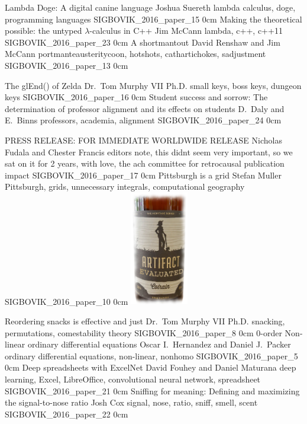 \addpaper
	{Lambda Doge: A digital canine language}
	{Joshua Suereth}
	{lambda calculus, doge, programming languages}
	{SIGBOVIK_2016_paper_15}
	{0cm}
	{}
\addpaper
	{Making the theoretical possible: the untyped $\lambda$-calculus in C++}
	{Jim McCann}
	{lambda, c++, c++11}
	{SIGBOVIK_2016_paper_23}
	{0cm}
	{}
\addpaper
	{A shortmantout}
	{David Renshaw and Jim McCann}
	{portmanteausteritycoon, hotshots, cathartichokes, sadjustment}
	{SIGBOVIK_2016_paper_13}
	{0cm}
	{}

\addpaper
	{The glEnd() of Zelda}
	{Dr.\ Tom Murphy VII Ph.D.}
	{small keys, boss keys, dungeon keys}
	{SIGBOVIK_2016_paper_16}
	{0cm}
	{}
\addpaper
	{Student success and sorrow: The determination of professor alignment and its effects on students}
	{D.\ Daly and E.\ Binns}
	{professors, academia, alignment}
	{SIGBOVIK_2016_paper_24}
	{0cm}
	{}

\addpaper
	{PRESS RELEASE: FOR IMMEDIATE WORLDWIDE RELEASE}
	{Nicholas Fudala and Chester Francis}
	{editors note, this didnt seem very important, so we sat on it for 2 years, with love, the ach committee for retrocausal publication impact}
	{SIGBOVIK_2016_paper_17}
	{0cm}
	{}
\addpaper
	{Pittsburgh is a grid}
	{Stefan Muller}
	{Pittsburgh, grids, unnecessary integrals, computational geography}
	{SIGBOVIK_2016_paper_10}
	{0cm}
	{\includegraphics[width=1in]{eval}}

\addpaper
	{Reordering snacks is effective and just}
	{Dr.\ Tom Murphy VII Ph.D.}
	{snacking, permutations, comestability theory}
	{SIGBOVIK_2016_paper_8}
	{0cm}
	{}
\addpaper
	{0-order Non-linear ordinary differential equations}
	{Oscar I.\ Hernandez and Daniel J.\ Packer}
	{ordinary differential equations, non-linear, nonhomo}
	{SIGBOVIK_2016_paper_5}
	{0cm}
	{}
\addpaper
	{Deep spreadsheets with ExcelNet}
	{David Fouhey and Daniel Maturana}
	{deep learning, Excel, LibreOffice, convolutional neural network, spreadsheet}
	{SIGBOVIK_2016_paper_21}
	{0cm}
	{}
\addpaper
	{Sniffing for meaning: Defining and maximizing the signal-to-nose ratio}
	{Josh Cox}
	{signal, nose, ratio, sniff, smell, scent}
	{SIGBOVIK_2016_paper_22}
	{0cm}
	{}

